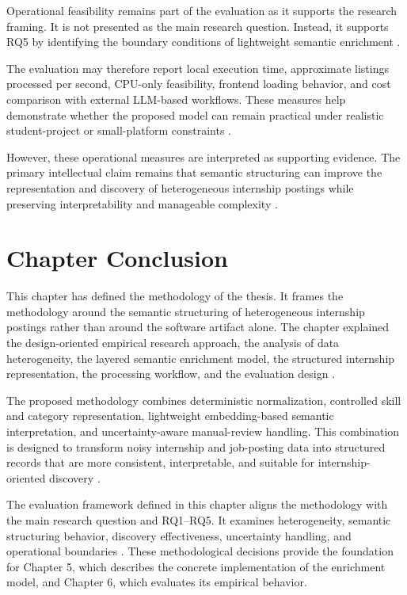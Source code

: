 Operational feasibility remains part of the evaluation as it supports the research framing. It is not presented as the main research question. Instead, it supports RQ5 by identifying the boundary conditions of lightweight semantic enrichment \cite{jain1991art, menghani2023efficient}.

The evaluation may therefore report local execution time, approximate listings processed per second, CPU-only feasibility, frontend loading behavior, and cost comparison with external LLM-based workflows. These measures help demonstrate whether the proposed model can remain practical under realistic student-project or small-platform constraints \cite{schwartz2020green, jain1991art}.

However, these operational measures are interpreted as supporting evidence. The primary intellectual claim remains that semantic structuring can improve the representation and discovery of heterogeneous internship postings while preserving interpretability and manageable complexity \cite{peffers2007design}.


\section{Chapter Conclusion}

This chapter has defined the methodology of the thesis. It frames the methodology around the semantic structuring of heterogeneous internship postings rather than around the software artifact alone. The chapter explained the design-oriented empirical research approach, the analysis of data heterogeneity, the layered semantic enrichment model, the structured internship representation, the processing workflow, and the evaluation design \cite{hevner2004design, peffers2007design}.

The proposed methodology combines deterministic normalization, controlled skill and category representation, lightweight embedding-based semantic interpretation, and uncertainty-aware manual-review handling. This combination is designed to transform noisy internship and job-posting data into structured records that are more consistent, interpretable, and suitable for internship-oriented discovery \cite{sarawagi2008information, reimers2019sentence, krippendorff2004content}.

The evaluation framework defined in this chapter aligns the methodology with the main research question and RQ1--RQ5. It examines heterogeneity, semantic structuring behavior, discovery effectiveness, uncertainty handling, and operational boundaries \cite{wohlin2012experimentation, sokolova2009systematic, jarvelin2002cumulated}. These methodological decisions provide the foundation for Chapter 5, which describes the concrete implementation of the enrichment model, and Chapter 6, which evaluates its empirical behavior.

